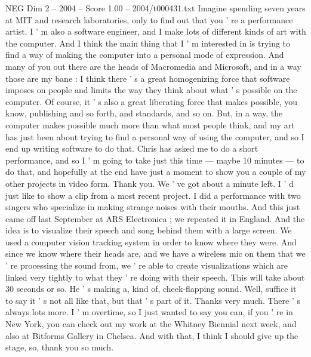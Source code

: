 \begin{textsample}{NEG Dim 2 – 2004 – Score 1.00 – 2004/t000431.txt}  \label{ex:f2_neg_071}
Imagine spending seven years at MIT and research laboratories, only to find out that you ' re a performance artist.
I ' m also a software engineer, and I make lots of different kinds of art with the computer.
And I think the main thing that I ' m interested in is trying to find a way of making the computer into a personal mode of expression.
And many of you out there are the heads of Macromedia and Microsoft, and in a way those are my bane : I think there ' s a great homogenizing force that software imposes on people and limits the way they think about what ' s possible on the computer.
Of course, it ' s also a great liberating force that makes possible, you know, publishing and so forth, and standards, and so on.
But, in a way, the computer makes possible much more than what most people think, and my art has just been about trying to find a personal way of using the computer, and so I end up writing software to do that.
Chris has asked me to do a short performance, and so I ' m going to take just this time — maybe 10 minutes — to do that, and hopefully at the end have just a moment to show you a couple of my other projects in video form.
Thank you.
We ' ve got about a minute left.
I ' d just like to show a clip from a most recent project.
I did a performance with two singers who specialize in making strange noises with their mouths.
And this just came off last September at ARS Electronica ; we repeated it in England.
And the idea is to visualize their speech and song behind them with a large screen.
We used a computer vision tracking system in order to know where they were.
And since we know where their heads are, and we have a wireless mic on them that we ' re processing the sound from, we ' re able to create visualizations which are linked very tightly to what they ' re doing with their speech.
This will take about 30 seconds or so.
He ' s making a, kind of, cheek-flapping sound.
Well, suffice it to say it ' s not all like that, but that ' s part of it.
Thanks very much.
There ' s always lots more.
I ' m overtime, so I just wanted to say you can, if you ' re in New York, you can check out my work at the Whitney Biennial next week, and also at Bitforms Gallery in Chelsea.
And with that, I think I should give up the stage, so, thank you so much.

\end{textsample}
